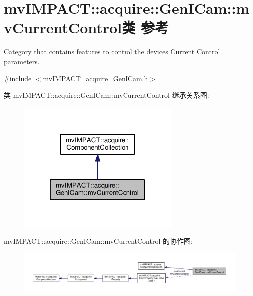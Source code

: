 \hypertarget{classmv_i_m_p_a_c_t_1_1acquire_1_1_gen_i_cam_1_1mv_current_control}{\section{mv\+I\+M\+P\+A\+C\+T\+:\+:acquire\+:\+:Gen\+I\+Cam\+:\+:mv\+Current\+Control类 参考}
\label{classmv_i_m_p_a_c_t_1_1acquire_1_1_gen_i_cam_1_1mv_current_control}
}


Category that contains features to control the devices Current Control parameters.  




{\ttfamily \#include $<$mv\+I\+M\+P\+A\+C\+T\+\_\+acquire\+\_\+\+Gen\+I\+Cam.\+h$>$}



类 mv\+I\+M\+P\+A\+C\+T\+:\+:acquire\+:\+:Gen\+I\+Cam\+:\+:mv\+Current\+Control 继承关系图\+:
\nopagebreak
\begin{figure}[H]
\begin{center}
\leavevmode
\includegraphics[width=222pt]{classmv_i_m_p_a_c_t_1_1acquire_1_1_gen_i_cam_1_1mv_current_control__inherit__graph}
\end{center}
\end{figure}


mv\+I\+M\+P\+A\+C\+T\+:\+:acquire\+:\+:Gen\+I\+Cam\+:\+:mv\+Current\+Control 的协作图\+:
\nopagebreak
\begin{figure}[H]
\begin{center}
\leavevmode
\includegraphics[width=350pt]{classmv_i_m_p_a_c_t_1_1acquire_1_1_gen_i_cam_1_1mv_current_control__coll__graph}
\end{center}
\end{figure}
